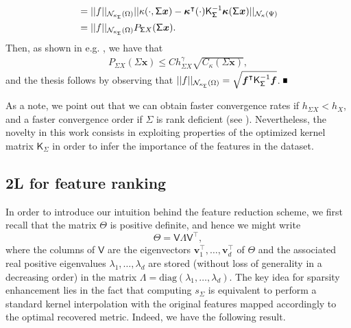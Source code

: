 \documentclass[hyphens,a4paper,11pt]{article}
\def\blackbox{\leavevmode\vrule height 5pt width 4pt depth 0pt\relax}
\newenvironment{proof}{\begin{trivlist}
\item[]\hspace{0cm}{\bf Proof:}
\hspace{0cm} }{\hfill $\blackbox$
\end{trivlist}}
\newcommand{\mK}{\mathsf{K}}
\newcommand{\mV}{\mathsf{V}}
\newcommand{\mTheta}{\mathsf{\Theta}}
\newcommand{\mSigma}{\mathsf{\Sigma}}
\newcommand{\mLambda}{\mathsf{\Lambda}}
\begin{document}
\begin{proof}
\begin{align*}
& = ||f||_{{\cal N}_{\kappa_{\mSigma}} (\Omega)} || \kappa(\cdot,\mSigma{\boldsymbol{x}})-\boldsymbol{\kappa}^{\intercal}(\cdot) \mK_{\mSigma}^{-1} \boldsymbol{\kappa}(\mSigma{\boldsymbol{x}}) ||_{{\cal N}_{\kappa} (\Psi)} \nonumber\\
& = ||f||_{{\cal N}_{\kappa_{\mSigma}} (\Omega)} {P}_{\mSigma X}(\mSigma {\boldsymbol{x}}). 
\end{align*}
Then, as shown in e.g. \cite[Theorem 14.5]{fasshauer2007meshfree}, we have that
\begin{align*}
{P}_{\mSigma X}(\mSigma {\boldsymbol{x}})  \leq  C h^{\gamma}_{ \mSigma{X}} \sqrt{C_{\kappa}(\mSigma{\boldsymbol{x}})},
\end{align*}
and the thesis follows by observing that $  ||f||_{{\cal N}_{\kappa_{\mSigma}} (\Omega)}  = \sqrt{\boldsymbol{f}^{\intercal}{\mK}_{\mSigma}^{-1} \boldsymbol{f}}$.
\end{proof} 
As a note, we point out that we can obtain faster convergence rates if $h_{\mSigma{X}} <h_{X}$, and a faster convergence order if $\mSigma$ is rank deficient (see \cite[Theorem 3.4]{Wenzel}). Nevertheless, the novelty in this work consists in exploiting properties of the optimized kernel matrix $\mK_{\mSigma}$ in order to infer the importance of the features in the dataset. %

\subsection{2L for feature ranking}

In order to introduce our intuition behind the feature reduction scheme, we first recall that the matrix $\mTheta$ is positive definite, and hence we might write 
$$
\mTheta = \mV \mLambda \mV^{\intercal}, 
$$
where the columns of $\mV$ are the eigenvectors $\boldsymbol{v}_1^{\intercal}, \ldots, \boldsymbol{v}_d^{\intercal}$ of $\mTheta$ and the associated real positive eigenvalues $\lambda_{1}, \ldots, \lambda_d $ are stored (without loss of generality in a decreasing order) in the matrix $\mLambda= \mathrm{diag}(\lambda_{1}, \ldots, \lambda_{d})$. The key idea for sparsity enhancement lies in the fact that computing $s_{\Sigma}$ is equivalent to perform a standard kernel interpolation with the original features mapped accordingly to the optimal recovered metric. Indeed, we have the following result. 
\end{document}
